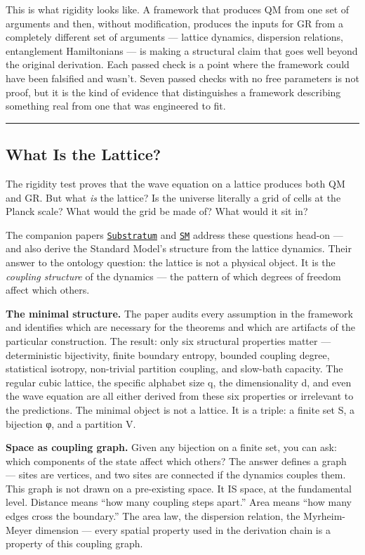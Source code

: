 \documentclass[
]{article}
\begin{document}
This is what rigidity looks like. A framework that produces QM from one
set of arguments and then, without modification, produces the inputs for
GR from a completely different set of arguments --- lattice dynamics,
dispersion relations, entanglement Hamiltonians --- is making a
structural claim that goes well beyond the original derivation. Each
passed check is a point where the framework could have been falsified
and wasn't. Seven passed checks with no free parameters is not proof,
but it is the kind of evidence that distinguishes a framework describing
something real from one that was engineered to fit.

\begin{center}\rule{0.5\linewidth}{0.5pt}\end{center}

\hypertarget{what-is-the-lattice}{%
\subsection{What Is the Lattice?}\label{what-is-the-lattice}}

The rigidity test proves that the wave equation on a lattice produces
both QM and GR. But what \emph{is} the lattice? Is the universe
literally a grid of cells at the Planck scale? What would the grid be
made of? What would it sit in?

The companion papers \href{Substratum.md}{\texttt{Substratum}} and
\href{SM.md}{\texttt{SM}} address these questions head-on --- and also
derive the Standard Model's structure from the lattice dynamics. Their
answer to the ontology question: the lattice is not a physical object.
It is the \emph{coupling structure} of the dynamics --- the pattern of
which degrees of freedom affect which others.

\textbf{The minimal structure.} The paper audits every assumption in the
framework and identifies which are necessary for the theorems and which
are artifacts of the particular construction. The result: only six
structural properties matter --- deterministic bijectivity, finite
boundary entropy, bounded coupling degree, statistical isotropy,
non-trivial partition coupling, and slow-bath capacity. The regular
cubic lattice, the specific alphabet size q, the dimensionality d, and
even the wave equation are all either derived from these six properties
or irrelevant to the predictions. The minimal object is not a lattice.
It is a triple: a finite set S, a bijection φ, and a partition V.

\textbf{Space as coupling graph.} Given any bijection on a finite set,
you can ask: which components of the state affect which others? The
answer defines a graph --- sites are vertices, and two sites are
connected if the dynamics couples them. This graph is not drawn on a
pre-existing space. It IS space, at the fundamental level. Distance
means ``how many coupling steps apart.'' Area means ``how many edges
cross the boundary.'' The area law, the dispersion relation, the
Myrheim-Meyer dimension --- every spatial property used in the
derivation chain is a property of this coupling graph.
\end{document}
